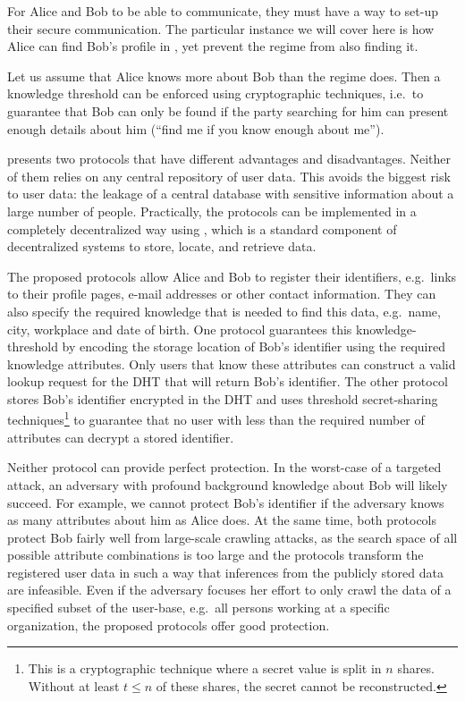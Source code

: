 For Alice and Bob to be able to communicate, they must have a way to set-up 
their secure communication.
The particular instance we will cover here is how Alice can find Bob's profile 
in , yet prevent the regime from also finding it.

Let us assume that Alice knows more about Bob than the regime does.
Then a knowledge threshold can be enforced using cryptographic techniques, 
i.e.\ to guarantee that Bob can only be found if the party searching for him 
can present enough details about him (\enquote{find me if you know enough about
me}).

\Textcite{ThresholdUserSearch} presents two protocols that have different 
advantages and disadvantages.
Neither of them relies on any central repository of user data.
This avoids the biggest risk to user data: the leakage of a central database 
with sensitive information about a large number of people.
Practically, the protocols can be implemented in a completely decentralized way 
using , which is a standard component of
decentralized systems to store, locate, and retrieve data.

The proposed protocols allow Alice and Bob to register their identifiers, e.g.\ 
links to their profile pages, e-mail addresses or other contact information.
They can also specify the required knowledge that is needed to find this data,  
e.g.\ name, city, workplace and date of birth.
One protocol guarantees this knowledge-threshold by encoding the storage 
location of Bob's identifier using the required knowledge attributes.
Only users that know these attributes can construct a valid lookup request for 
the \ac{DHT} that will return Bob's identifier.
The other protocol stores Bob's identifier encrypted in the \ac{DHT} and uses 
threshold secret-sharing techniques\footnote{%
  This is a cryptographic technique where a secret value is split in \(n\) 
  shares.
  Without at least \(t\leq n\) of these shares, the secret cannot be 
  reconstructed.
} to guarantee that no user with less than the required number of attributes 
can decrypt a stored identifier.

Neither protocol can provide perfect protection.
In the worst-case of a targeted attack, an adversary with profound background 
knowledge about Bob will likely succeed.
For example, we cannot protect Bob's identifier if the adversary knows as many 
attributes about him as Alice does.
At the same time, both protocols protect Bob fairly well from large-scale 
crawling attacks, as the search space of all possible attribute combinations is 
too large and the protocols transform the registered user data in such a way 
that inferences from the publicly stored data are infeasible.
Even if the adversary focuses her effort to only crawl the data of a specified 
subset of the user-base, e.g.\ all persons working at a specific organization, 
the proposed protocols offer good protection. 

